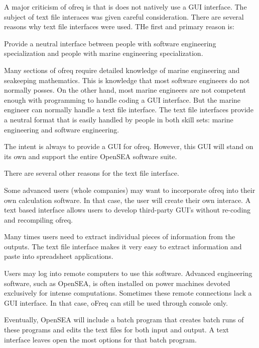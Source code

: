 A major criticism of ofreq is that is does not natively use a G\-U\-I interface. The subject of text file interaces was given careful consideration. There are several reasons why text file interfaces were used. T\-He first and primary reason is\-:


\begin{DoxyItemize}
\item Provide a neutral interface between people with software engineering specialization and people with marine engineering specialization.
\end{DoxyItemize}

Many sections of ofreq require detailed knowledge of marine engineering and seakeeping mathematics. This is knowledge that most software engineers do not normally posses. On the other hand, most marine engineers are not competent enough with programming to handle coding a G\-U\-I interface. But the marine engineer can normally handle a text file interface. The text file interfaces provide a neutral format that is easily handled by people in both skill sets\-: marine engineering and software engineering.

The intent is always to provide a G\-U\-I for ofreq. However, this G\-U\-I will stand on its own and support the entire Open\-S\-E\-A software suite.

There are several other reasons for the text file interface.


\begin{DoxyEnumerate}
\item Some advanced users (whole companies) may want to incorporate ofreq into their own calculation software. In that case, the user will create their own interace. A text based interface allows users to develop third-\/party G\-U\-I's without re-\/coding and recompiling ofreq.
\item Many times users need to extract individual pieces of information from the outputs. The text file interface makes it very easy to extract information and paste into spreadsheet applications.
\item Users may log into remote computers to use this software. Advanced engineering software, such as Open\-S\-E\-A, is often installed on power machines devoted exclusively for intense computations. Sometimes these remote connections lack a G\-U\-I interface. In that case, o\-Freq can still be used through console only.
\item Eventually, Open\-S\-E\-A will include a batch program that creates batch runs of these programs and edits the text files for both input and output. A text interface leaves open the most options for that batch program.
\end{DoxyEnumerate}

